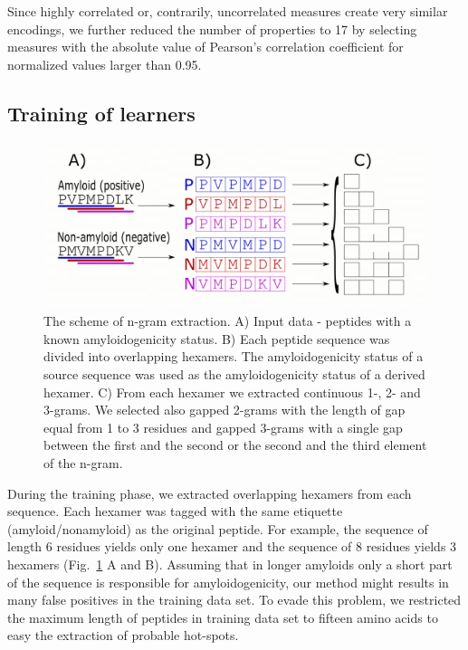 \documentclass{bioinfo}
\begin{document}
\begin{methods}
  Since highly correlated or, contrarily, uncorrelated measures create very 
similar encodings, we further reduced the number of properties to 17 by 
selecting measures with the absolute value of Pearson's correlation coefficient 
for normalized values larger than 0.95.

\subsection{Training of learners}

\begin{figure}[!tpb]
\centerline{\includegraphics[width=\columnwidth]{figures/ngram_scheme.png}}
  \caption{The scheme of n-gram extraction. A) Input data - peptides with a 
known amyloidogenicity status. B) Each peptide sequence was divided into 
overlapping hexamers. The amyloidogenicity status of a source sequence was used 
as the amyloidogenicity status of a derived hexamer. C) From each hexamer we 
extracted continuous 1-, 2- and 3-grams. We selected also gapped 2-grams with 
the length of gap equal from 1 to 3 residues and gapped 3-grams with a single 
gap between the first and the second or the second and the third element of the 
n-gram.}
\label{fig:ngram_scheme}
\end{figure}

During the training phase, we extracted overlapping hexamers from each sequence. 
Each hexamer was tagged with the same etiquette (amyloid/nonamyloid) as the 
original peptide. For example, the sequence of length 6 residues yields only one 
hexamer and the sequence of 8 residues yields 3 hexamers 
(Fig.~\ref{fig:ngram_scheme} A and B).  Assuming that in longer amyloids only a 
short part of the sequence is responsible for amyloidogenicity, our method might 
results in many false positives in the training data set. To evade this problem, 
we restricted the maximum length of peptides in training data set to fifteen 
amino acids to easy the extraction of probable hot-spots.


\end{methods}
\end{document}
